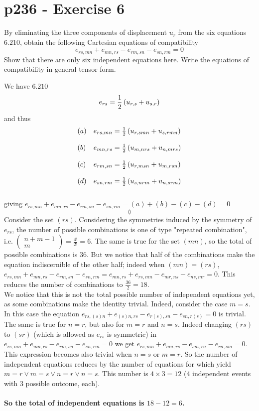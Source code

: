 \section{p236 - Exercise 6}
\begin{tcolorbox}
By eliminating the three components of displacement $u_r$ from the six equations $\mathbf{6.210}$, obtain the following Cartesian equations of compatibility 
$$ e_{rs,mn}+e_{mn,rs}-e_{rm,sn}-e_{sn,rm}=0$$
Show that there are only six independent equations here. Write the equations of compatibility in general tensor form.
\end{tcolorbox}
We have $\mathbf{6.210}$
\begin{align}
e_{rs}= \frac{1}{2}\left(u_{r,s}+u_{s,r}\right)
\end{align}
and thus
\begin{align}
\begin{array}{ll}
(a)&e_{rs,mn}= \frac{1}{2}\left(u_{r,smn}+u_{s,rmn}\right)\\\\
(b)&e_{mn,rs}= \frac{1}{2}\left(u_{m,nrs}+u_{n,mrs}\right)\\\\
(c)&e_{rm,sn}= \frac{1}{2}\left(u_{r,msn}+u_{m,rsn}\right)\\\\
(d)&e_{sn,rm}= \frac{1}{2}\left(u_{s,nrm}+u_{n,srm}\right)\\\\
\end{array}
\end{align}
giving $e_{rs,mn}+e_{mn,rs}-e_{rm,sn}-e_{sn,rm}= (a)+(b)-(c)-(d)=0$
$$\lozenge$$
Consider the set $(rs)$. Considering the symmetries induced by the symmetry of $e_{rs}$, the number of possible combinations is one of type "repeated combination", i.e.   $\left(\begin{matrix}n+m-1\\m\end{matrix}\right)=\frac{4!}{2!} = 6$. The same is true for the  set $(mn)$, so the total of possible combinations is $36$. But we notice that half of the combinations make the equation indiscernible of the other half; indeed when $(mn)=(rs)$, $e_{rs,mn}+e_{mn,rs}-e_{rm,sn}-e_{sn,rm}=e_{mn,rs}+e_{rs,mn}-e_{mr,ns}-e_{ns,mr}=0$. This reduces the number of combinations to $\frac{36}{2}= 18$.\\
We notice that this is not the total possible number of independent equations yet, as some combinations make the identity trivial. Indeed, consider the case $m=s$. In this case the equation $e_{rs,(s)n}+e_{(s)n,rs}-e_{r(s),sn}-e_{sn,r(s)}=0$ is trivial. The same is true for $n=r$, but also for $m=r$ and $n=s$. Indeed changing $(rs) $ to  $(sr)$ (which is allowed as $e_{rs}$ is symmetric) in  $e_{rs,mn}+e_{mn,rs}-e_{rm,sn}-e_{sn,rm}=0$ we get  $e_{rs,mn}+e_{mn,rs}-e_{sm,rn}-e_{rn,sm}=0$. This expression becomes also trivial when $n=s$ or $m=r$. So the number of independent equations reduces by the number of equations for which yield $ m=r\vee m=s\vee n= r \vee n=s$. This number is $4\times 3=12$ (4 independent events with $3$ possible outcome, each). \\\\
\textbf{So the total of independent equations is $18-12= 6$.}

